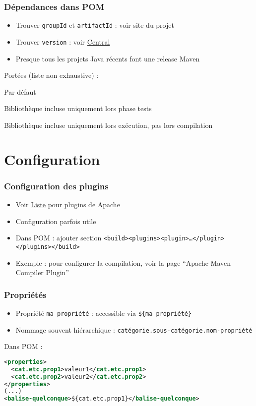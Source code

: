 \documentclass[english, french]{beamer}
\begin{document}
\begin{frame}
	\frametitle{Dépendances dans POM}
	\begin{itemize}
		\item Trouver \texttt{groupId} et \texttt{artifactId} : voir site du projet
		\item Trouver \texttt{version} : voir \href{https://search.maven.org}{Central}
		\item Presque tous les projets Java récents font une release Maven
	\end{itemize}
	Portées {\tiny (liste non exhaustive)} :
	\begin{description}
		\item[\texttt{compile}] Par défaut
		\item[\texttt{test}] Bibliothèque incluse uniquement lors phase tests
		\item[\texttt{runtime}] Bibliothèque incluse uniquement lors exécution, pas lors compilation
	\end{description}
\end{frame}

\section{Configuration}
\begin{frame}
	\frametitle{Configuration des plugins}
	\begin{itemize}
		\item Voir \href{https://maven.apache.org/plugins/index.html}{Liste} pour plugins de Apache
		\item Configuration parfois utile
		\item Dans POM : ajouter section \texttt{<build><plugins><plugin>…</plugin></plugins></build>}
		\item Exemple : pour configurer la compilation, voir la page “Apache Maven Compiler Plugin”
	\end{itemize}
\end{frame}

\begin{frame}[fragile]
	\frametitle{Propriétés}
	\begin{itemize}
		\item Propriété \texttt{ma propriété} : accessible via \texttt{\$\{ma propriété\}}
		\item Nommage souvent hiérarchique : \texttt{catégorie.sous-catégorie.nom-propriété}
	\end{itemize}
	Dans POM : 
	\begin{lstlisting}[keywordstyle=\fontspec{Latin Modern Mono Light}\textbf, emph={project, modelVersion, groupId, artifactId, version}, emphstyle=\fontspec{Latin Modern Mono Light}\textbf, language=XML, basicstyle=\small\NoAutoSpacing\ttfamily, aboveskip=0pt, belowskip=0pt, showstringspaces=false]
<properties>
  <cat.etc.prop1>valeur1</cat.etc.prop1>
  <cat.etc.prop2>valeur2</cat.etc.prop2>
</properties>
(...)
<balise-quelconque>${cat.etc.prop1}</balise-quelconque>
		\end{lstlisting}
\end{frame}
\end{document}
